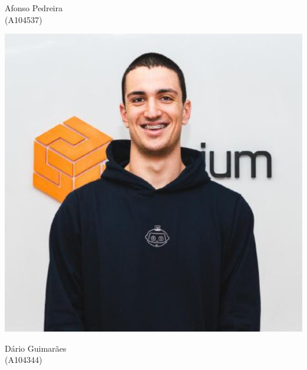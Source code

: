 {\begin{center}
\begin{minipage}{120pt}
        \parbox{120pt}{\centering\normalsize{Afonso Pedreira \\ (A104537)}}
    \end{minipage}
    \hspace{0.5cm}
    \begin{minipage}{120pt}
        \includegraphics[scale=0.2]{images/team/dario.png}
        \parbox{120pt}{\centering\normalsize{Dário Guimarães \\ (A104344)}}
    \end{minipage}

    \vspace{0.5cm}


\end{center}}
